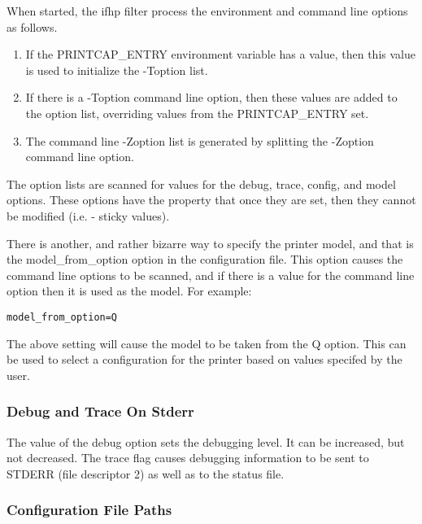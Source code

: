\documentclass[a4paper]{article}
\begin{document}
When started,
the
{\ttfamily ifhp}
filter process the environment and command line options as follows.
\begin{enumerate}
\item If the
{\ttfamily PRINTCAP\_ENTRY}
environment variable has a value,
then this value is used to initialize the
{\ttfamily -Toption}
list.
\item If there is a
{\ttfamily -Toption}
command line option,
then these values are added to the
option list,
overriding values from the
{\ttfamily PRINTCAP\_ENTRY}
set.
\item The command line
{\ttfamily -Zoption}
list is generated by splitting the
{\ttfamily -Zoption}
command line option.
\end{enumerate}


The option lists are scanned for values for the
{\ttfamily debug},
{\ttfamily trace},
{\ttfamily config},
and
{\ttfamily model}
options.
These options
have the property that once they are set, then they cannot be modified
(i.e. - sticky values).

\label{model_from_option}
There is another,
and rather bizarre way to specify the printer model,
and that is the
{\ttfamily model\_from\_option}
option in the configuration file.
This option causes the command line options to be scanned,
and if there is a value for the command line option then it
is used as the model.
For example:
\begin{tscreen}
\begin{verbatim}
model_from_option=Q
\end{verbatim}
\end{tscreen}


The above setting will cause the model to be taken from the
{\ttfamily Q} option.
This can be used to select a configuration for the printer
based on values specifed by the user.


\subsubsection{Debug and Trace On Stderr
\label{debug}
\label{trace}}

The value of the
{\ttfamily debug}
option sets the debugging level.
It can be increased, but not decreased.
The
{\ttfamily trace}
flag causes debugging information to be sent to STDERR (file descriptor 2)
as well as to the status file.


\subsubsection{Configuration File Paths
\label{configpaths}
\label{config}}
\end{document}
